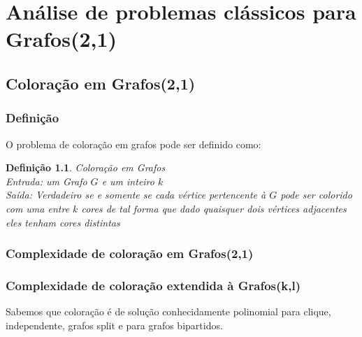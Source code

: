 \documentclass[
	12pt,				%
	openright,			%
	oneside,			%
	a4paper,			%
	english,			%
	french,				%
	spanish,			%
	brazil				%
	]{abntex2}
\newtheorem{definition}{Definição}
\begin{document}


\part{Análise de problemas clássicos para Grafos(2,1)}

\chapter{Coloração em Grafos(2,1)}

\section{Definição}

O problema de coloração em grafos pode ser definido como:

\begin{definition}
  Coloração em Grafos\\
  Entrada: um Grafo $G$ e um inteiro $k$\\
  Saída: Verdadeiro se e somente se cada vértice pertencente à $G$ pode ser colorido com uma entre $k$ cores
  de tal forma que dado quaisquer dois vértices adjacentes eles tenham cores distintas
\end{definition}

\section{Complexidade de coloração em Grafos(2,1)}

\section{Complexidade de coloração extendida à Grafos(k,l)}

Sabemos que coloração é de solução conhecidamente polinomial para clique, independente, grafos split e para grafos bipartidos.
\end{document}
